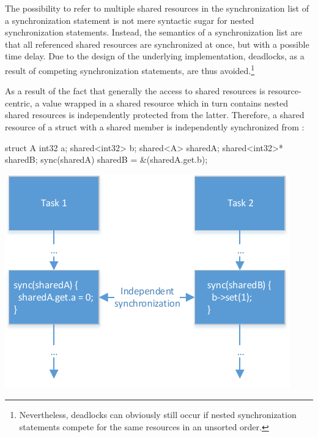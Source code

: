 \vspace*{4mm}

The possibility to refer to multiple shared resources in the synchronization list of a synchronization statement is not mere syntactic sugar for nested synchronization statements. Instead, the semantics of a synchronization list are that all referenced shared resources are synchronized at once, but with a possible time delay. Due to the design of the underlying implementation, deadlocks, as a result of competing synchronization statements, are thus avoided.\footnote{Nevertheless, deadlocks can obviously still occur if nested synchronization statements compete for the same resources in an unsorted order.}

As a result of the fact that generally the access to shared resources is resource-centric, a value wrapped in a shared resource which in turn contains nested shared resources is independently protected from the latter. Therefore, a shared resource of a struct with a shared member  is independently synchronized from :

\begin{minipage}{1\textwidth}
\begin{minipage}{0.5\textwidth}
\begin{ccode}{}
struct A {
  int32 a;
  shared<int32> b; 
}
shared<A> sharedA;
shared<int32>* sharedB;
sync(sharedA) { sharedB = &(sharedA.get.b); }
\end{ccode}
\end{minipage}
\begin{minipage}{0.08\textwidth}
\begin{center}
\end{center}
\end{minipage}
\begin{minipage}{0.35\textwidth}
\includegraphics[scale=.9]{pics/ParallelExecution}
\end{minipage}
\end{minipage}


